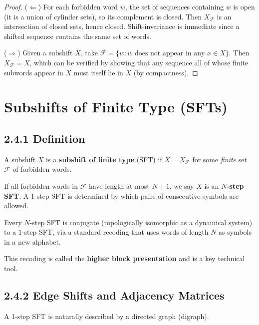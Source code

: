 \begin{proof}
($\Leftarrow$) For each forbidden word $w$, the set of sequences containing $w$ is open (it is a union of cylinder sets), so its complement is closed. Then $X_{\mathcal{F}}$ is an intersection of closed sets, hence closed. Shift-invariance is immediate since a shifted sequence contains the same set of words.

($\Rightarrow$) Given a subshift $X$, take $\mathcal{F} = \{ w : w \text{ does not appear in any } x \in X \} $. Then $X_{\mathcal{F}} = X$, which can be verified by showing that any sequence all of whose finite subwords appear in $X$ must itself lie in $X$ (by compactness). 
\end{proof}

\section{Subshifts of Finite Type (SFTs)}

\subsection{2.4.1 Definition}

\begin{definition}[SFT]
A subshift $X$ is a \textbf{subshift of finite type} (SFT) if $X = X_{\mathcal{F}}$ for some \textit{finite} set $\mathcal{F}$ of forbidden words.

If all forbidden words in $\mathcal{F}$ have length at most $N+1$, we say $X$ is an \textbf{$N$-step SFT}. A $1$-step SFT is determined by which pairs of consecutive symbols are allowed.
\end{definition}

\begin{proposition}
Every $N$-step SFT is conjugate (topologically isomorphic as a dynamical system) to a $1$-step SFT, via a standard recoding that uses words of length $N$ as symbols in a new alphabet.

This recoding is called the \textbf{higher block presentation} and is a key technical tool.
\end{proposition}

\subsection{2.4.2 Edge Shifts and Adjacency Matrices}

A 1-step SFT is naturally described by a directed graph (digraph).

